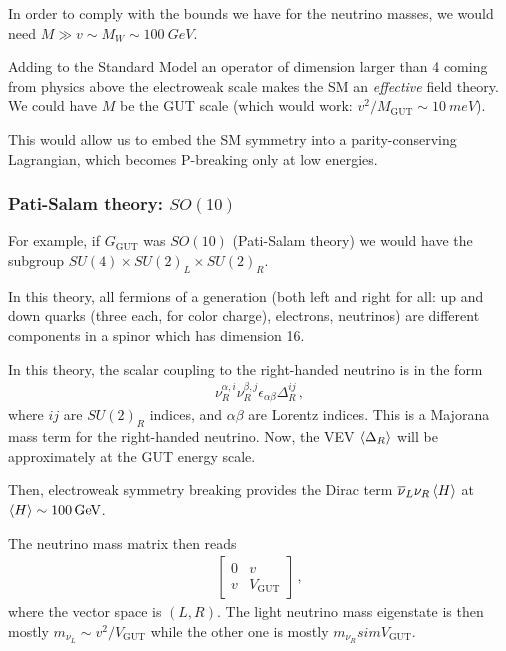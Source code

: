 \documentclass[main.tex]{subfiles}
\begin{document}
In order to comply with the bounds we have for the neutrino masses, we would need \(M \gg v \sim M_W \sim \SI{100}{GeV}\).

Adding to the Standard Model an operator of dimension larger than 4 coming from physics above the electroweak scale makes the SM an \emph{effective} field theory. 
We could have \(M\) be the GUT scale (which would work: \(v^2 / M _{\text{GUT}} \sim \SI{10}{meV}\)). 

This would allow us to embed the SM symmetry into a parity-conserving Lagrangian, which becomes P-breaking only at low energies.

\subsubsection{Pati-Salam theory: \(SO(10)\)}

For example, if \(G _{\text{GUT}}\) was \(SO(10)\) (Pati-Salam theory) we would have the subgroup \(SU(4) \times SU(2)_L \times SU(2)_R\). 

In this theory, all fermions of a generation (both left and right for all: up and down quarks (three each, for color charge), electrons, neutrinos) are different components in a spinor which has dimension 16. 

In this theory, the scalar coupling to the right-handed neutrino is in the form 
%
\begin{align}
\nu_{R}^{\alpha , i} \nu_{R}^{\beta, j } \epsilon_{\alpha \beta } \Delta^{ij}_{R}
\,,
\end{align}
%
where \(ij\) are \(SU(2)_R\) indices, and \(\alpha \beta \) are Lorentz indices.
This is a Majorana mass term for the right-handed neutrino.
Now, the VEV \(\expval{\Delta_{R}}\) will be approximately at the GUT energy scale.

Then, electroweak symmetry breaking provides the Dirac term \(\overline{\nu}_{L} \nu_{R} \expval{H}\) at \(\expval{H} \sim \SI{100}{GeV}\). 

The neutrino mass matrix then reads 
%
\begin{align}
\left[\begin{array}{cc}
0 & v \\ 
v & V _{\text{GUT}}
\end{array}\right]
\,,
\end{align}
%
where the vector space is \((L, R)\). 
The light neutrino mass eigenstate is then mostly \(m_{\nu_{L}} \sim v^2 / V _{\text{GUT}}\) while the other one is mostly \(m_{\nu_{R}} sim
 V _{\text{GUT}}\). 
 
\end{document}
